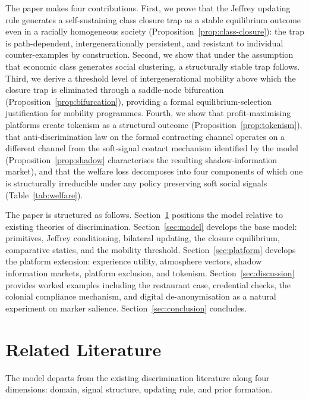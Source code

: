 \documentclass[12pt,a4paper]{article}
\theoremstyle{definition}
\numberwithin{proposition}{subsection}
\begin{document}
The paper makes four contributions. First, we prove that the
Jeffrey updating rule generates a self-sustaining class closure
trap as a stable equilibrium outcome even in a racially homogeneous
society (Proposition~\ref{prop:class-closure}): the trap is
path-dependent, intergenerationally persistent, and resistant to
individual counter-examples by construction. Second, we show that
under the assumption that economic class generates social
clustering, a structurally stable trap follows. Third, we derive a
threshold level of intergenerational mobility above which the
closure trap is eliminated through a saddle-node bifurcation
(Proposition~\ref{prop:bifurcation}), providing a formal
equilibrium-selection justification for mobility programmes.
Fourth, we show that profit-maximising platforms create tokenism as
a structural outcome (Proposition~\ref{prop:tokenism}), that
anti-discrimination law on the formal contracting channel operates
on a different channel from the soft-signal contact mechanism
identified by the model (Proposition~\ref{prop:shadow} characterises
the resulting shadow-information market), and that the welfare loss
decomposes into four components of which one is structurally
irreducible under any policy preserving soft social signals
(Table~\ref{tab:welfare}). 

The paper is structured as follows. Section~\ref{sec:lit} positions
the model relative to existing theories of discrimination.
Section~\ref{sec:model} develops the base model: primitives, Jeffrey
conditioning, bilateral updating, the closure equilibrium,
comparative statics, and the mobility threshold.
Section~\ref{sec:platform} develops the platform extension: experience
utility, atmosphere vectors, shadow information markets, platform
exclusion, and tokenism. Section~\ref{sec:discussion} provides
worked examples including the restaurant case, credential checks,
the colonial compliance mechanism, and digital de-anonymisation as
a natural experiment on marker salience.
Section~\ref{sec:conclusion} concludes.

\section{Related Literature}
\label{sec:lit}

The model departs from the existing discrimination literature along
four dimensions: domain, signal structure, updating rule, and prior
formation.
\end{document}
